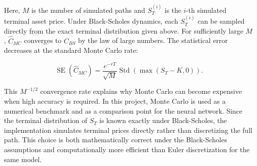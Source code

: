 Here, $M$ is the number of simulated paths and $S_T^{(i)}$ is the $i$-th simulated terminal asset price.
Under Black-Scholes dynamics, each $S_T^{(i)}$ can be sampled directly from the exact terminal distribution given above.
For sufficiently large $M$, $\hat{C}_{MC}$ converges to $C_{BS}$ by the law of large numbers.
The statistical error decreases at the standard Monte Carlo rate:

\begin{equation}
    \operatorname{SE}(\hat{C}_{MC}) =
    \frac{e^{-rT}}{\sqrt{M}}
    \operatorname{Std}\left(\max(S_T - K, 0)\right).
\end{equation}

This $M^{-1/2}$ convergence rate explains why Monte Carlo can become expensive when high accuracy is required.
In this project, Monte Carlo is used as a numerical benchmark and as a comparison point for the neural network.
Since the terminal distribution of $S_T$ is known exactly under Black-Scholes, the implementation simulates terminal prices directly rather than discretizing the full path.
This choice is both mathematically correct under the Black-Scholes assumptions and computationally more efficient than Euler discretization for the same model.
